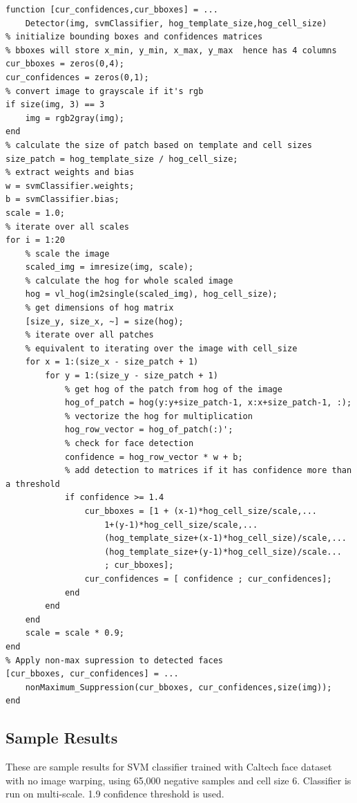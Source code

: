 \documentclass{article}
\begin{document}
\begin{lstlisting}[caption={My implementation of Detector function.},captionpos=b]
function [cur_confidences,cur_bboxes] = ...
    Detector(img, svmClassifier, hog_template_size,hog_cell_size)
% initialize bounding boxes and confidences matrices
% bboxes will store x_min, y_min, x_max, y_max  hence has 4 columns
cur_bboxes = zeros(0,4);
cur_confidences = zeros(0,1);
% convert image to grayscale if it's rgb
if size(img, 3) == 3
    img = rgb2gray(img);
end
% calculate the size of patch based on template and cell sizes
size_patch = hog_template_size / hog_cell_size;
% extract weights and bias
w = svmClassifier.weights;
b = svmClassifier.bias;
scale = 1.0;
% iterate over all scales
for i = 1:20
    % scale the image
    scaled_img = imresize(img, scale);
    % calculate the hog for whole scaled image
    hog = vl_hog(im2single(scaled_img), hog_cell_size);
    % get dimensions of hog matrix
    [size_y, size_x, ~] = size(hog);
    % iterate over all patches
    % equivalent to iterating over the image with cell_size
    for x = 1:(size_x - size_patch + 1)
        for y = 1:(size_y - size_patch + 1)
            % get hog of the patch from hog of the image
            hog_of_patch = hog(y:y+size_patch-1, x:x+size_patch-1, :);
            % vectorize the hog for multiplication
            hog_row_vector = hog_of_patch(:)';
            % check for face detection      
            confidence = hog_row_vector * w + b;
            % add detection to matrices if it has confidence more than a threshold
            if confidence >= 1.4
                cur_bboxes = [1 + (x-1)*hog_cell_size/scale,...
                    1+(y-1)*hog_cell_size/scale,...
                    (hog_template_size+(x-1)*hog_cell_size)/scale,...
                    (hog_template_size+(y-1)*hog_cell_size)/scale...
                    ; cur_bboxes];
                cur_confidences = [ confidence ; cur_confidences];
            end
        end
    end
    scale = scale * 0.9;
end 
% Apply non-max supression to detected faces
[cur_bboxes, cur_confidences] = ...
    nonMaximum_Suppression(cur_bboxes, cur_confidences,size(img));
end
\end{lstlisting}

\subsection{Sample Results}
These are sample results for SVM classifier trained with Caltech face dataset with no image warping, using 65,000 negative samples and cell size 6. Classifier is run on multi-scale. 1.9 confidence threshold is used.
\end{document}
